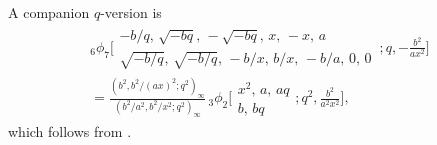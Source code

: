 \documentclass[12pt,reqno]{amsart}
\begin{document}
A companion $q$-version is
\begin{multline*}
{}_6\phi_7\biggl[\begin{matrix} -b/q, \, \sqrt{-bq}, \, -\sqrt{-bq}, \, x, \, -x, \, a \\
\sqrt{-b/q}, \, \sqrt{-b/q}, \, -b/x, \, b/x, \, -b/a, \, 0, \, 0 \end{matrix}\,; q,-\frac{b^2}{ax^2}\biggr]
\\
=\frac{(b^2,b^2/(ax)^2;q^2)_\infty}{(b^2/a^2,b^2/x^2;q^2)_\infty}
\,{}_3\phi_2\biggl[\begin{matrix} x^2, \, a, \, aq \\ b, \, bq \end{matrix}; q^2,\frac{b^2}{a^2x^2}\biggr],
\end{multline*}
which follows from \cite[Eq.~(3.10.4)]{GR04}.
\end{document}
